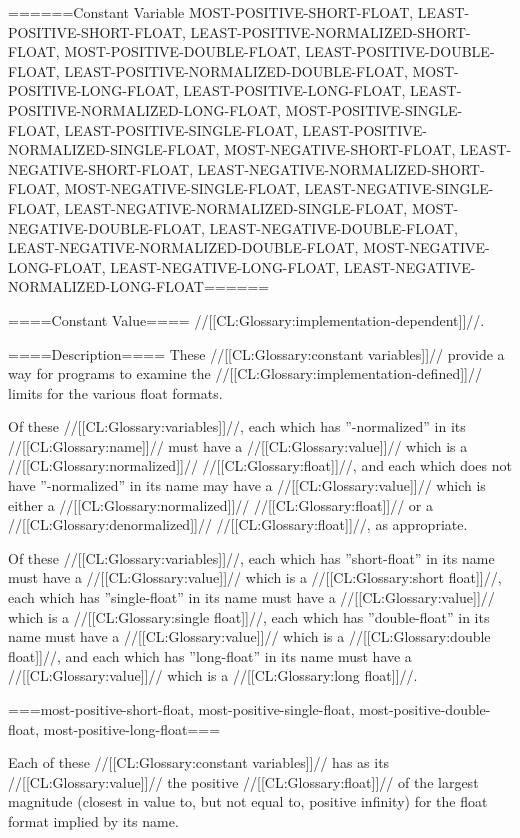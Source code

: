 ======Constant Variable MOST-POSITIVE-SHORT-FLOAT, LEAST-POSITIVE-SHORT-FLOAT, LEAST-POSITIVE-NORMALIZED-SHORT-FLOAT, MOST-POSITIVE-DOUBLE-FLOAT, LEAST-POSITIVE-DOUBLE-FLOAT, LEAST-POSITIVE-NORMALIZED-DOUBLE-FLOAT, MOST-POSITIVE-LONG-FLOAT, LEAST-POSITIVE-LONG-FLOAT, LEAST-POSITIVE-NORMALIZED-LONG-FLOAT, MOST-POSITIVE-SINGLE-FLOAT, LEAST-POSITIVE-SINGLE-FLOAT, LEAST-POSITIVE-NORMALIZED-SINGLE-FLOAT, MOST-NEGATIVE-SHORT-FLOAT, LEAST-NEGATIVE-SHORT-FLOAT, LEAST-NEGATIVE-NORMALIZED-SHORT-FLOAT, MOST-NEGATIVE-SINGLE-FLOAT, LEAST-NEGATIVE-SINGLE-FLOAT, LEAST-NEGATIVE-NORMALIZED-SINGLE-FLOAT, MOST-NEGATIVE-DOUBLE-FLOAT, LEAST-NEGATIVE-DOUBLE-FLOAT, LEAST-NEGATIVE-NORMALIZED-DOUBLE-FLOAT, MOST-NEGATIVE-LONG-FLOAT, LEAST-NEGATIVE-LONG-FLOAT, LEAST-NEGATIVE-NORMALIZED-LONG-FLOAT======

====Constant Value====
//[[CL:Glossary:implementation-dependent]]//.

====Description====
These //[[CL:Glossary:constant variables]]// provide a way for programs to examine the //[[CL:Glossary:implementation-defined]]// limits for the various float formats.

Of these //[[CL:Glossary:variables]]//, each which has ''-normalized'' in its //[[CL:Glossary:name]]// must have a //[[CL:Glossary:value]]// which is a //[[CL:Glossary:normalized]]// //[[CL:Glossary:float]]//, and each which does not have ''-normalized'' in its name may have a //[[CL:Glossary:value]]// which is either a //[[CL:Glossary:normalized]]// //[[CL:Glossary:float]]// or a //[[CL:Glossary:denormalized]]// //[[CL:Glossary:float]]//, as appropriate.

Of these //[[CL:Glossary:variables]]//, each which has ''short-float'' in its name must have a //[[CL:Glossary:value]]// which is a //[[CL:Glossary:short float]]//, each which has ''single-float'' in its name must have a //[[CL:Glossary:value]]// which is a //[[CL:Glossary:single float]]//, each which has ''double-float'' in its name must have a //[[CL:Glossary:value]]// which is a //[[CL:Glossary:double float]]//, and each which has ''long-float'' in its name must have a //[[CL:Glossary:value]]// which is a //[[CL:Glossary:long float]]//.

===most-positive-short-float, most-positive-single-float, most-positive-double-float, most-positive-long-float===

Each of these //[[CL:Glossary:constant variables]]// has as its //[[CL:Glossary:value]]// the positive //[[CL:Glossary:float]]// of the largest magnitude (closest in value to, but not equal to, positive infinity) for the float format implied by its name.

